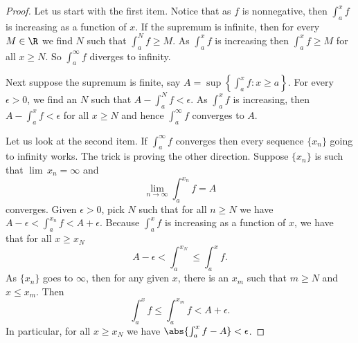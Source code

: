 \documentclass[12pt]{book}
\begin{document}
\begin{proof}
Let us start with the first item.
Notice that as $f$ is nonnegative,
then $\int_a^x f$ is increasing as a function of $x$.
If the supremum is infinite, then for every $M \in \R$
we find $N$ such that $\int_a^N f \geq M$.
As $\int_a^x f$
is increasing then $\int_a^x f \geq M$ for all $x \geq N$.
So
$\int_a^\infty f$ diverges to infinity.

Next suppose the supremum is finite, say
$A = \sup \left\{ \int_a^x f : x \geq a \right\}$.
For every $\epsilon > 0$, we find an $N$ such that
$A - \int_a^N f < \epsilon$.
As $\int_a^x f$ is increasing,
then
$A - \int_a^x f < \epsilon$ for all $x \geq N$ and hence
$\int_a^\infty f$ converges to $A$.

Let us look at the second item.
If $\int_a^\infty f$ converges then every sequence $\{ x_n \}$ going to
infinity works.
The trick is
proving the other direction.
Suppose $\{ x_n \}$ is such that $\lim\, x_n =
\infty$ and
\begin{equation*}
\lim_{n\to\infty} \int_a^{x_n} f = A
\end{equation*}
converges.
Given $\epsilon > 0$, pick $N$ such that for
all $n \geq N$ we have
$A - \epsilon < \int_a^{x_n} f < A + \epsilon$.
Because $\int_a^x f$ is increasing as a function of $x$, we have that for all
$x \geq x_N$
\begin{equation*}
A - \epsilon < \int_a^{x_N} \leq \int_a^x f .
\end{equation*}
As $\{ x_n \}$ goes to $\infty$, then for any given
$x$, there is an $x_m$ such that $m \geq N$ and $x \leq x_m$.
Then
\begin{equation*}
\int_a^{x} f \leq \int_a^{x_m} f < A + \epsilon .
\end{equation*}
In particular, for all $x \geq x_N$ we have
$\abs{\int_a^{x} f - A} < \epsilon$.
\end{proof}
\end{document}
